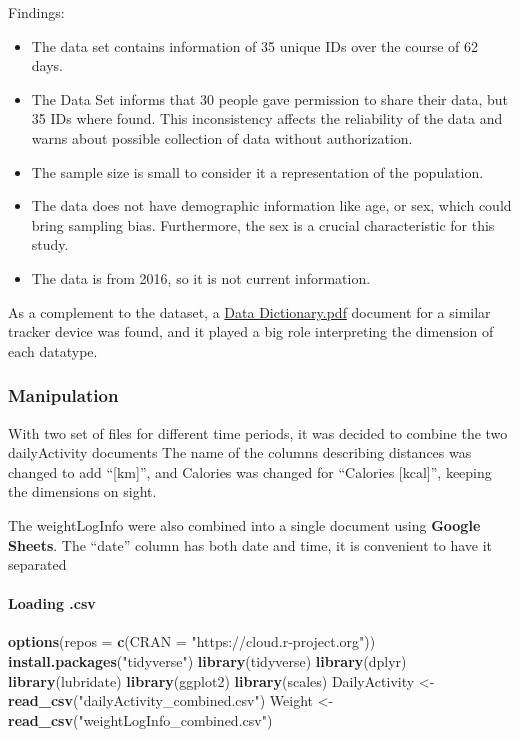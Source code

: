 \documentclass[
]{article}
\newenvironment{Shaded}{\begin{snugshade}}{\end{snugshade}}
\newcommand{\AttributeTok}[1]{\textcolor[rgb]{0.13,0.29,0.53}{#1}}
\newcommand{\FunctionTok}[1]{\textcolor[rgb]{0.13,0.29,0.53}{\textbf{#1}}}
\newcommand{\NormalTok}[1]{#1}
\newcommand{\OtherTok}[1]{\textcolor[rgb]{0.56,0.35,0.01}{#1}}
\newcommand{\StringTok}[1]{\textcolor[rgb]{0.31,0.60,0.02}{#1}}
\providecommand{\tightlist}{%
  \setlength{\itemsep}{0pt}\setlength{\parskip}{0pt}}
\begin{document}
Findings:

\begin{itemize}
\tightlist
\item
  The data set contains information of 35 unique IDs over the course of
  62 days.
\item
  The Data Set informs that 30 people gave permission to share their
  data, but 35 IDs where found. This inconsistency affects the
  reliability of the data and warns about possible collection of data
  without authorization.
\item
  The sample size is small to consider it a representation of the
  population.
\item
  The data does not have demographic information like age, or sex, which
  could bring sampling bias. Furthermore, the sex is a crucial
  characteristic for this study.
\item
  The data is from 2016, so it is not current information.
\end{itemize}

As a complement to the dataset, a
\href{https://www.fitabase.com/media/1930/fitabasedatadictionary102320.pdf}{Data
Dictionary.pdf} document for a similar tracker device was found, and it
played a big role interpreting the dimension of each datatype.

\subsubsection{Manipulation}\label{manipulation}

With two set of files for different time periods, it was decided to
combine the two dailyActivity documents The name of the columns
describing distances was changed to add ``{[}km{]}'', and Calories was
changed for ``Calories {[}kcal{]}'', keeping the dimensions on sight.

The weightLogInfo were also combined into a single document using
\textbf{Google Sheets}. The ``date'' column has both date and time, it
is convenient to have it separated

\paragraph{Loading .csv}\label{loading-.csv}

\begin{Shaded}
\begin{Highlighting}[]
\FunctionTok{options}\NormalTok{(}\AttributeTok{repos =} \FunctionTok{c}\NormalTok{(}\AttributeTok{CRAN =} \StringTok{"https://cloud.r{-}project.org"}\NormalTok{))}
\FunctionTok{install.packages}\NormalTok{(}\StringTok{"tidyverse"}\NormalTok{)}
\FunctionTok{library}\NormalTok{(tidyverse)}
\FunctionTok{library}\NormalTok{(dplyr)}
\FunctionTok{library}\NormalTok{(lubridate)}
\FunctionTok{library}\NormalTok{(ggplot2)}
\FunctionTok{library}\NormalTok{(scales)}
\NormalTok{DailyActivity }\OtherTok{\textless{}{-}} \FunctionTok{read\_csv}\NormalTok{(}\StringTok{"dailyActivity\_combined.csv"}\NormalTok{)}
\NormalTok{Weight }\OtherTok{\textless{}{-}} \FunctionTok{read\_csv}\NormalTok{(}\StringTok{"weightLogInfo\_combined.csv"}\NormalTok{)}
\end{Highlighting}
\end{Shaded}
\end{document}
